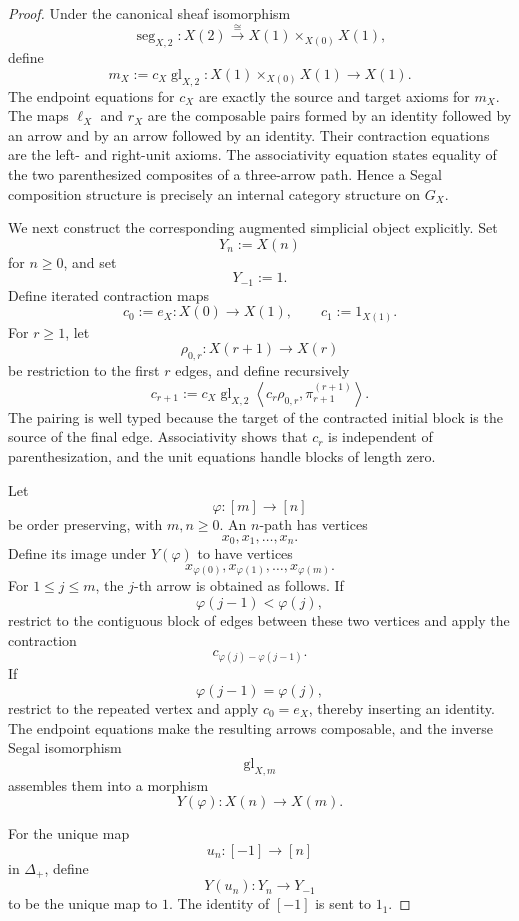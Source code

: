 \begin{proof}
Under the canonical sheaf isomorphism
\[
    \operatorname{seg}_{X,2}:
    X(2)
    \xrightarrow{\cong}
    X(1)\times_{X(0)}X(1),
\]
define
\[
    m_X
    :=
    c_X\operatorname{gl}_{X,2}:
    X(1)\times_{X(0)}X(1)
    \to X(1).
\]
The endpoint equations for \(c_X\) are exactly the source and target axioms
for \(m_X\). The maps \(\ell_X\) and \(r_X\) are the composable pairs formed
by an identity followed by an arrow and by an arrow followed by an identity.
Their contraction equations are the left- and right-unit axioms. The
associativity equation states equality of the two parenthesized composites of
a three-arrow path. Hence a Segal composition structure is precisely an
internal category structure on \(G_X\).

We next construct the corresponding augmented simplicial object explicitly.
Set
\[
    Y_n:=X(n)
\]
for \(n\geq0\), and set
\[
    Y_{-1}:=1.
\]
Define iterated contraction maps
\[
    c_0:=e_X:X(0)\to X(1),
    \qquad
    c_1:=1_{X(1)}.
\]
For \(r\geq1\), let
\[
    \rho_{0,r}:X(r+1)\to X(r)
\]
be restriction to the first \(r\) edges, and define recursively
\[
    c_{r+1}
    :=
    c_X\operatorname{gl}_{X,2}
    \left\langle
        c_r\rho_{0,r},
        \pi_{r+1}^{(r+1)}
    \right\rangle.
\]
The pairing is well typed because the target of the contracted initial block
is the source of the final edge. Associativity shows that \(c_r\) is
independent of parenthesization, and the unit equations handle blocks of
length zero.

Let
\[
    \varphi:[m]\to[n]
\]
be order preserving, with \(m,n\geq0\). An \(n\)-path has vertices
\[
    x_0,x_1,\ldots,x_n.
\]
Define its image under \(Y(\varphi)\) to have vertices
\[
    x_{\varphi(0)},
    x_{\varphi(1)},
    \ldots,
    x_{\varphi(m)}.
\]
For \(1\leq j\leq m\), the \(j\)-th arrow is obtained as follows. If
\[
    \varphi(j-1)<\varphi(j),
\]
restrict to the contiguous block of edges between these two vertices and
apply the contraction
\[
    c_{\varphi(j)-\varphi(j-1)}.
\]
If
\[
    \varphi(j-1)=\varphi(j),
\]
restrict to the repeated vertex and apply \(c_0=e_X\), thereby inserting an
identity. The endpoint equations make the resulting arrows composable, and
the inverse Segal isomorphism
\[
    \operatorname{gl}_{X,m}
\]
assembles them into a morphism
\[
    Y(\varphi):X(n)\to X(m).
\]

For the unique map
\[
    u_n:[-1]\to[n]
\]
in \(\Delta_+\), define
\[
    Y(u_n):Y_n\to Y_{-1}
\]
to be the unique map to \(1\). The identity of \([-1]\) is sent to
\(1_1\).


\end{proof}

